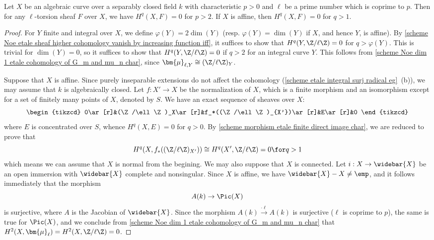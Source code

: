 \begin{corollary}\label{scheme curve over separably closed field cohomology of ell-sheaf vanish >2}
Let $X$ be an algebraic curve over a separably closed field $k$ with characteristic $p>0$ and $\ell$ be a prime number which is coprime to $p$. Then for any $\ell$-torsion sheaf $F$ over $X$, we have $H^q(X,F)=0$ for $p>2$. If $X$ is affine, then $H^q(X,F)=0$ for $q>1$.
\end{corollary}
\begin{proof}
For $Y$ finite and integral over $X$, we define $\varphi(Y)=2\dim(Y)$ (resp. $\varphi(Y)=\dim(Y)$ if $X$, and hence $Y$, is affine). By \cref{scheme Noe etale sheaf higher cohomology vanish by increasing function iff}, it suffices to show that $H^q(Y,\Z/\ell\Z)=0$ for $q>\varphi(Y)$. This is trivial for $\dim(Y)=0$, so it suffices to show that $H^q(Y,\Z/\ell\Z)=0$ if $q>2$ for an integral curve $Y$. This follows from \cref{scheme Noe dim 1 etale cohomology of G_m and mu_n char}, since $\bm{\mu}_{\ell,Y}\cong(\Z/\ell\Z)_Y$.\par
Suppose that $X$ is affine. Since purely inseparable extensions do not affect the cohomology (\cref{scheme etale integral surj radical eg}~(b)), we may assume that $k$ is algebraically closed. Let $f:X'\to X$ be the normalization of $X$, which is a finite morphism and an isomorphism except for a set of finitely many points of $X$, denoted by $S$. We have an exact sequence of sheaves over $X$:
\[\begin{tikzcd}
0\ar[r]&(\Z/\ell\Z)_X\ar[r]&f_*((\Z/\ell\Z)_{X'})\ar[r]&E\ar[r]&0
\end{tikzcd}\]
where $E$ is concentrated over $S$, whence $H^q(X,E)=0$ for $q>0$. By \cref{scheme morphism etale finite direct image char}, we are reduced to prove that
\[H^q(X,f_*((\Z/\ell\Z)_{X'}))\cong H^q(X',\Z/\ell\Z)=0\for q>1\]
which means we can assume that $X$ is normal from the begining. We may also suppose that $X$ is connected. Let $i:X\to\widebar{X}$ be an open immersion with $\widebar{X}$ complete and nonsingular. Since $X$ is affine, we have $\widebar{X}-X\neq\emp$, and it follows immediately that the morphism
\[A(k)\to\Pic(X)\]
is surjective, where $A$ is the Jacobian of $\widebar{X}$. Since the morphism $A(k)\stackrel{\cdot\ell}{\to}A(k)$ is surjective ($\ell$ is coprime to $p$), the same is true for $\Pic(X)$, and we conclude from \cref{scheme Noe dim 1 etale cohomology of G_m and mu_n char} that $H^2(X,\bm{\mu}_\ell)=H^2(X,\Z/\ell\Z)=0$.
\end{proof}

